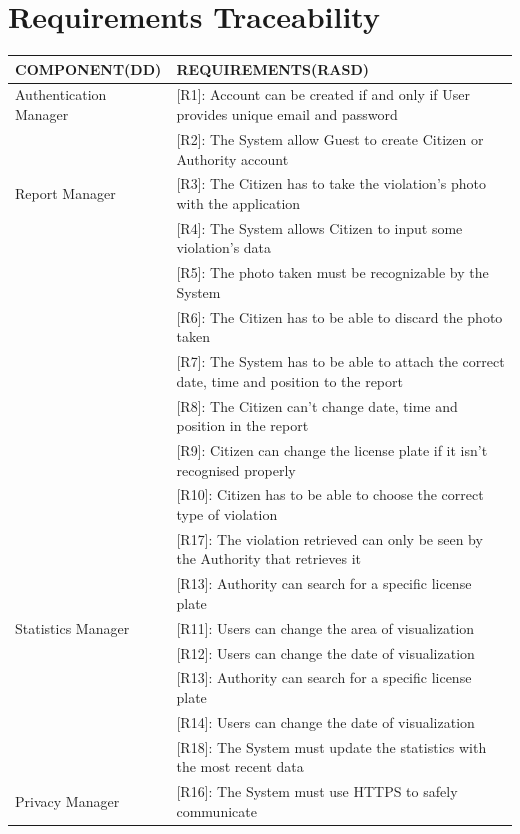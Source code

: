 \documentclass{article}
\begin{document}
\section{Requirements Traceability}
\begin{center}
    \begin{tabular}{ | l | l |}
        \hline
        COMPONENT(DD) & REQUIREMENTS(RASD) \\
        \hline
        Authentication Manager & [R1]: Account can be created if and only if User provides unique email and password \\
                               & [R2]: The System allow Guest to create Citizen or Authority account \\
        \hline
        Report Manager  & [R3]: The Citizen has to take the violation’s photo with the application \\
                        & [R4]: The System allows Citizen to input some violation’s data \\
                        & [R5]: The photo taken must be recognizable by the System \\
                        & [R6]: The Citizen has to be able to discard the photo taken \\
                        & [R7]: The System has to be able to attach the correct date, time and position to the report \\
                        & [R8]: The Citizen can’t change date, time and position in the report \\ 
                        & [R9]: Citizen can change the license plate if it isn’t recognised properly \\
                        & [R10]: Citizen has to be able to choose the correct type of violation \\
                        & [R17]: The violation retrieved can only be seen by the Authority that retrieves it \\
                        & [R13]: Authority can search for a specific license plate \\ 
        \hline
        Statistics Manager & [R11]: Users can change the area of visualization \\
                           & [R12]: Users can change the date of visualization \\
                           & [R13]: Authority can search for a specific license plate \\
                           & [R14]: Users can change the date of visualization \\
                           & [R18]: The System must update the statistics with the most recent data \\
        \hline
        Privacy Manager & [R16]: The System must use HTTPS to safely communicate \\


\end{tabular}
\end{center}
\end{document}
